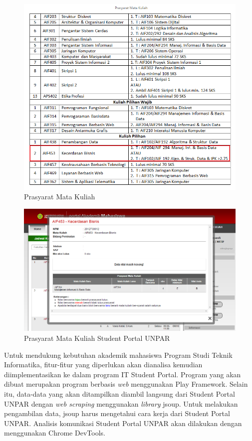 \begin{figure}[H]
	\centering
	\includegraphics[scale=0.5]{Gambar/contoh-tinyurl}
	\caption{Prasyarat Mata Kuliah\cite{prasyaratIT}}
	\label{fig:1_prasyarat_tinyurl}
\end{figure}

\begin{figure}[H]
	\centering
	\includegraphics[scale=0.5]{Gambar/contoh-portal}
	\caption{Prasyarat Mata Kuliah Student Portal UNPAR\cite{studentportalunpar}}
	\label{fig:1_prasyarat_student_portal}
\end{figure}

Untuk mendukung kebutuhan akademik mahasiswa Program Studi Teknik Informatika, fitur-fitur yang diperlukan akan dianalisa kemudian diimplementasikan ke dalam program IT Student Portal. Program yang akan dibuat merupakan program berbasis \textit{web} menggunakan Play Framework. Selain itu, data-data yang akan ditampilkan diambil langsung dari Student Portal UNPAR dengan \textit{web scraping} menggunakan \textit{library} jsoup. Untuk melakukan pengambilan data, jsoup harus mengetahui cara kerja dari Student Portal UNPAR. Analisis komunikasi Student Portal UNPAR akan dilakukan dengan menggunakan Chrome DevTools. 

